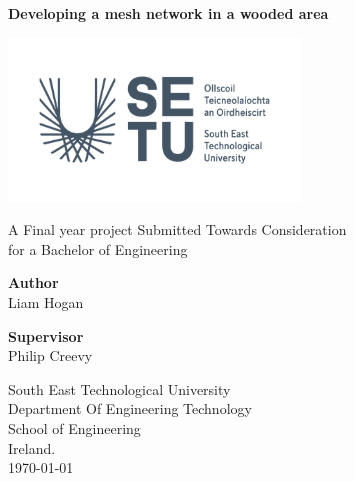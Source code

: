 \thispagestyle{empty}

\begin{center}
	\begin{LARGE}
		\textbf{Developing a mesh network in a wooded area} \\
	
	\end{LARGE}

\vspace{40pt}

\begin{center}
	\includegraphics[width=220pt]{Images/SETU_Ireland_logo.png}
\end{center}

\vspace{50pt}

A Final year project Submitted Towards Consideration \\
for a Bachelor of Engineering \\

\vspace{60pt}

\textbf{Author} \\
Liam Hogan \\

\vspace{40pt}

\textbf{Supervisor} \\
Philip Creevy \\

\vspace{30pt}

South East Technological University \\
Department Of Engineering Technology \\
School of Engineering \\
Ireland. \\
\today
\end{center}
